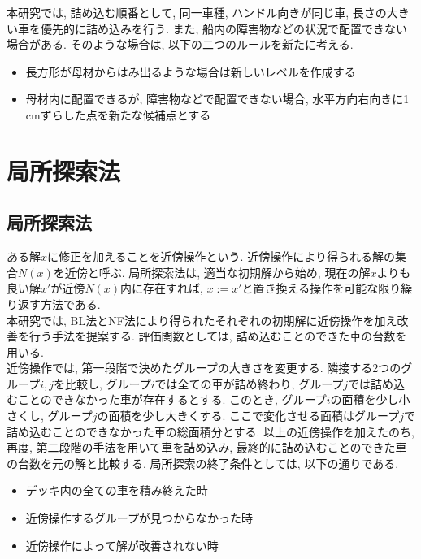 本研究では, 詰め込む順番として, 同一車種, ハンドル向きが同じ車, 長さの大きい車を優先的に詰め込みを行う.  
また, 船内の障害物などの状況で配置できない場合がある. 
そのような場合は, 以下の二つのルールを新たに考える. 
\begin{itemize}
    \item 長方形が母材からはみ出るような場合は新しいレベルを作成する
    \item 母材内に配置できるが, 障害物などで配置できない場合, 水平方向右向きに1 cmずらした点を新たな候補点とする
\end{itemize}


\section{局所探索法}
\subsection*{局所探索法}
ある解$x$に修正を加えることを近傍操作という\cite{local-search}. 
近傍操作により得られる解の集合$N(x)$を近傍と呼ぶ. 
局所探索法は, 適当な初期解から始め, 現在の解$x$よりも良い解$x'$が近傍$N(x)$内に存在すれば, $x:=x'$と置き換える操作を可能な限り繰り返す方法である. \\

本研究では, BL法とNF法により得られたそれぞれの初期解に近傍操作を加え改善を行う手法を提案する. 
評価関数としては, 詰め込むことのできた車の台数を用いる. \\
近傍操作では, 第一段階で決めたグループの大きさを変更する. 
隣接する2つのグループ$i,j$を比較し, グループ$i$では全ての車が詰め終わり, グループ$j$では詰め込むことのできなかった車が存在するとする. 
このとき, グループ$i$の面積を少し小さくし, グループ$j$の面積を少し大きくする. 
ここで変化させる面積はグループ$j$で詰め込むことのできなかった車の総面積分とする. 
以上の近傍操作を加えたのち, 再度, 第二段階の手法を用いて車を詰め込み, 最終的に詰め込むことのできた車の台数を元の解と比較する. 
局所探索の終了条件としては, 以下の通りである. 
\begin{itemize}
    \item デッキ内の全ての車を積み終えた時
    \item 近傍操作するグループが見つからなかった時
    \item 近傍操作によって解が改善されない時
\end{itemize}